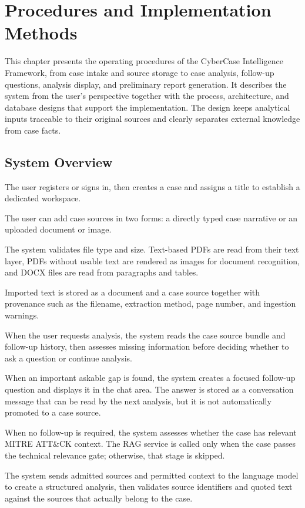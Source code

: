 \chapter{Procedures and Implementation Methods}

This chapter presents the operating procedures of the CyberCase Intelligence Framework, from case intake and source storage to case analysis, follow-up questions, analysis display, and preliminary report generation. It describes the system from the user's perspective together with the process, architecture, and database designs that support the implementation. The design keeps analytical inputs traceable to their original sources and clearly separates external knowledge from case facts.

\section{System Overview}

The user registers or signs in, then creates a case and assigns a title to establish a dedicated workspace.

The user can add case sources in two forms: a directly typed case narrative or an uploaded document or image.

The system validates file type and size. Text-based PDFs are read from their text layer, PDFs without usable text are rendered as images for document recognition, and DOCX files are read from paragraphs and tables.

Imported text is stored as a document and a case source together with provenance such as the filename, extraction method, page number, and ingestion warnings.

When the user requests analysis, the system reads the case source bundle and follow-up history, then assesses missing information before deciding whether to ask a question or continue analysis.

When an important askable gap is found, the system creates a focused follow-up question and displays it in the chat area. The answer is stored as a conversation message that can be read by the next analysis, but it is not automatically promoted to a case source.

When no follow-up is required, the system assesses whether the case has relevant MITRE ATT\&CK context. The RAG service is called only when the case passes the technical relevance gate; otherwise, that stage is skipped.

The system sends admitted sources and permitted context to the language model to create a structured analysis, then validates source identifiers and quoted text against the sources that actually belong to the case.


